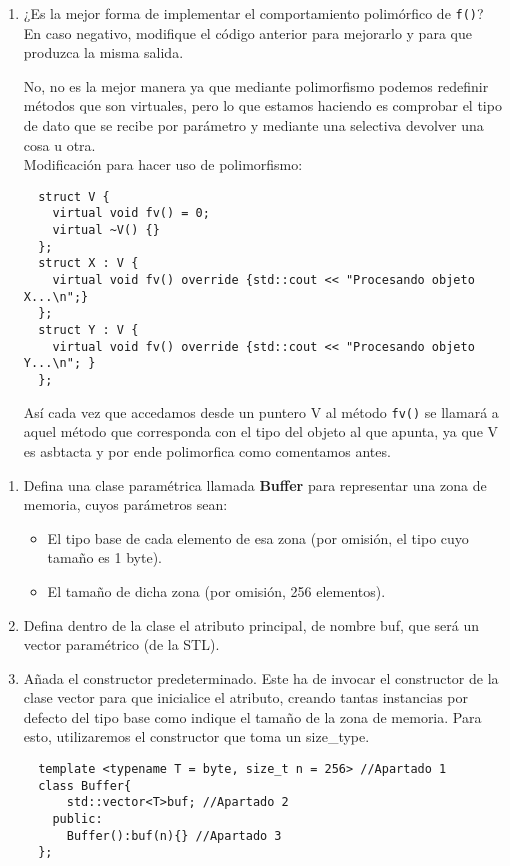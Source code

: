 \begin{enumerate}[label = \alph*)]
    \item ¿Es la mejor forma de implementar el comportamiento
  polimórfico de \texttt{f()}? En caso negativo, modifique el código
  anterior para mejorarlo y para que produzca la misma salida.

  No, no es la mejor manera ya que mediante polimorfismo podemos redefinir métodos que son virtuales, pero lo que estamos haciendo es comprobar el tipo de dato que se recibe por parámetro y mediante una selectiva devolver una cosa u otra.\\
  Modificación para hacer uso de polimorfismo:

  \begin{verbatim}
  struct V {
    virtual void fv() = 0;
    virtual ~V() {}
  };
  struct X : V {
    virtual void fv() override {std::cout << "Procesando objeto X...\n";}
  };
  struct Y : V {
    virtual void fv() override {std::cout << "Procesando objeto Y...\n"; }
  };
  \end{verbatim}
  Así cada vez que accedamos desde un puntero V al método \texttt{fv()} se llamará a aquel método que corresponda con el tipo del objeto al que apunta, ya que V es asbtacta y por ende polimorfica como comentamos antes.
\end{enumerate}
  
\begin{enumerate}[label = \alph*)]
\item Defina una clase paramétrica llamada \textbf{Buffer} para representar una zona de memoria, cuyos parámetros sean:
\begin{itemize}
  \item El tipo base de cada elemento de esa zona (por omisión, el tipo cuyo tamaño es 1 byte).

  \item El tamaño de dicha zona (por omisión, 256 elementos).
\end{itemize}

\item Defina dentro de la clase el atributo principal, de nombre buf, que será un vector paramétrico (de la STL).


\item Añada el constructor predeterminado. Este ha de invocar el constructor de la clase vector para que inicialice el atributo, creando tantas instancias por defecto del tipo base como indique el tamaño de la zona de memoria. Para esto, utilizaremos el constructor que toma un size\_type.

\begin{verbatim}
  template <typename T = byte, size_t n = 256> //Apartado 1
  class Buffer{
      std::vector<T>buf; //Apartado 2
    public:
      Buffer():buf(n){} //Apartado 3
  };
\end{verbatim}
\end{enumerate}
\newpage

